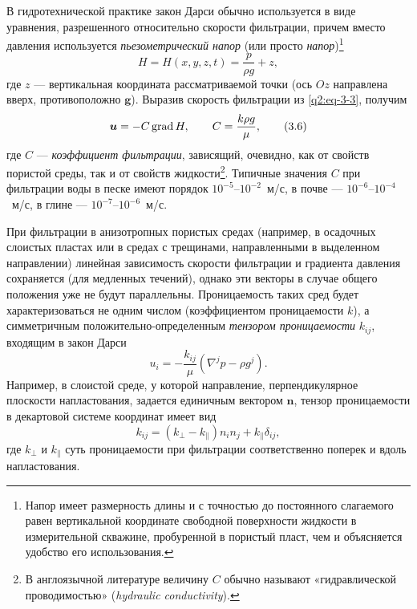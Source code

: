 В гидротехнической практике закон Дарси обычно используется в виде уравнения, разрешенного относительно скорости фильтрации, причем вместо давления используется
\textit{пьезометрический напор} (или просто \textit{напор})\setcounter{footnote}{0}\footnote{Напор имеет размерность длины и с точностью до постоянного слагаемого равен вертикальной координате свободной поверхности жидкости в измерительной скважине, пробуренной в пористый пласт, чем и объясняется удобство его использования.}
\[
H=H(x,y,z,t)=\frac{p}{\rho g}+z,
\]
где $z$ --- вертикальная координата рассматриваемой точки (ось $Oz$ направлена вверх, противоположно $\boldsymbol{g}$). Выразив скорость фильтрации из \eqref{q2:eq-3-3}, получим
\begin{equation}
\boldsymbol{u}=-C\operatorname{grad} H,\qquad C=\frac{k\rho g}{\mu},
\tag{3.6}\label{q2:eq-3-6}
\end{equation}
где $C$ --- \textit{коэффициент фильтрации}, зависящий, очевидно, как от свойств пористой среды, так и от свойств жидкости\footnote{В англоязычной литературе величину $C$ обычно называют «гидравлической проводимостью» (\textit{hydraulic conductivity}).}. Типичные значения $C$ при фильтрации воды в песке имеют порядок $10^{-5}$--$10^{-2}$~м/с, в почве --- $10^{-6}$--$10^{-4}$~м/с, в глине --- $10^{-7}$--$10^{-6}$~м/с.

При фильтрации в анизотропных пористых средах (например, в осадочных слоистых пластах или в средах с трещинами, направленными в выделенном направлении) линейная зависимость скорости фильтрации и градиента давления сохраняется (для медленных течений), однако эти векторы в случае общего положения уже не будут параллельны. Проницаемость таких сред будет характеризоваться не одним числом (коэффициентом проницаемости $k$), а симметричным положительно-определенным \textit{тензором проницаемости} $k_{ij}$, входящим в закон Дарси
\[
u_i=-\frac{k_{ij}}{\mu}(\nabla^jp-\rho g^j).
\]
Например, в слоистой среде, у которой направление, перпендикулярное плоскости напластования, задается единичным вектором $\boldsymbol{n}$, тензор проницаемости в декартовой системе координат имеет вид
\[
k_{ij}=(k_\perp-k_\parallel)n_in_j+k_\parallel\delta_{ij},
\]
где $k_\perp$ и $k_\parallel$ суть проницаемости при фильтрации соответственно поперек и вдоль напластования.

